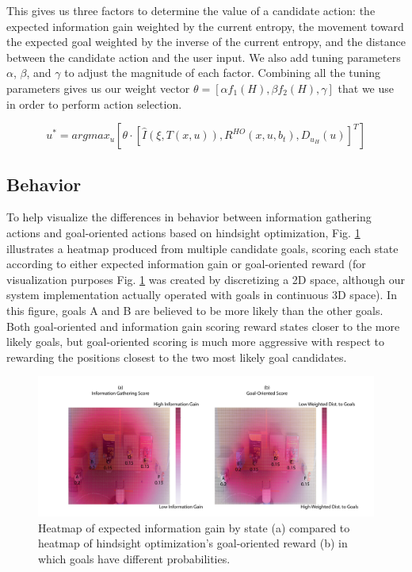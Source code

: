 \documentclass[conference]{IEEEtran}
\begin{document}
This gives us three factors to determine the value of a candidate action: the expected information gain weighted by the current entropy, the movement toward the expected goal weighted by the inverse of the current entropy, and the distance between the candidate action and the user input. We also add tuning parameters $\alpha$, $\beta$, and $\gamma$ to adjust the magnitude of each factor. Combining all the tuning parameters gives us our weight vector $\theta = [\alpha f_1(H), \beta f_2(H), \gamma]$ that we use in order to perform action selection.

\[
u^* = argmax_u [ \theta \cdot [\hat{I}(\xi, T(x,u)), R^{HO}(x,u,b_t), D_{u_H}(u)]^T ]
\]

\subsection{Behavior}

To help visualize the differences in behavior between information gathering actions and goal-oriented actions based on hindsight optimization, Fig. \ref{heatmap2} illustrates a heatmap produced from multiple candidate goals, scoring each state according to either expected information gain or goal-oriented reward (for visualization purposes Fig. \ref{heatmap2} was created by discretizing a 2D space, although our system implementation actually operated with goals in continuous 3D space). In this figure, goals A and B are believed to be more likely than the other goals. Both goal-oriented and information gain scoring reward states closer to the more likely goals, but goal-oriented scoring is much more aggressive with respect to rewarding the positions closest to the two most likely goal candidates.

\begin{figure}
\includegraphics[width=\columnwidth]{figures/Heatmap_Uneven_Belief.pdf}
\caption{Heatmap of expected information gain by state (a) compared to heatmap of hindsight optimization's goal-oriented reward (b) in which goals have different probabilities.}
\label{heatmap2}
\end{figure}
\end{document}
